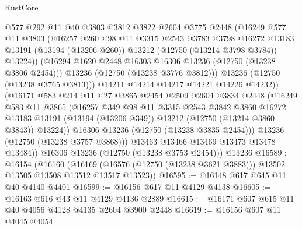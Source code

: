 \begin{lexlean}{RustCore}
\begin{coremodule}
                    @577
                    @292
                    @11
                    @40
                    @3803
                    @3812
                    @3822
                    @2604
                    @3775
                    @2448
                    (@16249
                      @577
                      @11
                      @3803
                      (@16257
                        @260
                        @98
                        @11
                        @3315
                        @2543
                        @3783
                        @3798
                        @16272
                        @13183
                        @13191
                        (@13194 (@13206 @260))
                        @13212
                        (@12750 (@13214 @3798 @3784))
                        @13224))
                    (@16294 @1620 @2448 @16303 @16306 @13236 (@12750 (@13238 @3806 @2454)))
                    @13236
                    (@12750 (@13238 @3776 @3812)))
                  @13236
                  (@12750 (@13238 @3765 @3813)))
                @14211
                @14214
                @14217
                @14221
                @14226
                @14232))
            (@16171
              @583
              @214
              @11
              @27
              @3865
              @2454
              @2509
              @2604
              @3834
              @2448
              (@16249
                @583
                @11
                @3865
                (@16257
                  @349
                  @98
                  @11
                  @3315
                  @2543
                  @3842
                  @3860
                  @16272
                  @13183
                  @13191
                  (@13194 (@13206 @349))
                  @13212
                  (@12750 (@13214 @3860 @3843))
                  @13224))
              @16306
              @13236
              (@12750 (@13238 @3835 @2454)))
            @13236
            (@12750 (@13238 @3757 @3868)))
          @13463
          @13466
          @13469
          @13473
          @13478
          @13484))
      @16306
      @13236
      (@12750 (@13238 @3753 @2454)))
    @13236
@16589 := @16154
    (@16160
      (@16169 (@16576 (@12750 (@13238 @3621 @3883))) @13502 @13505 @13508 @13512 @13517 @13523))
@16595 := @16148 @617 @645 @11 @40 @4140 @4401
@16599 := @16156 @617 @11 @4129 @4138
@16605 := @16163 @616 @43 @11 @4129 @4136 @2889
@16615 := @16171 @607 @615 @11 @40 @4056 @4128 @4135 @2604 @3900 @2448
@16619 := @16156 @607 @11 @4045 @4054

\end{coremodule}
\end{lexlean}
